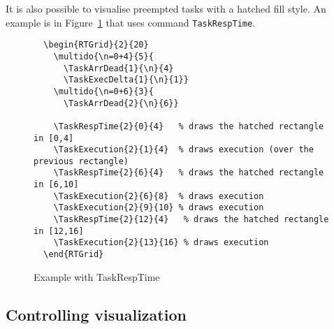 \documentclass{article}
\begin{document}
It is also possible to visualise preempted tasks with a hatched fill
style. An example is in Figure~\ref{fig:resp-time} that uses command
\texttt{TaskRespTime}. 

\begin{figure}
  \centering
  \begin{RTGrid}{2}{20}
 

  \end{RTGrid}  
\begin{verbatim}
  \begin{RTGrid}{2}{20}
    \multido{\n=0+4}{5}{         
      \TaskArrDead{1}{\n}{4}    
      \TaskExecDelta{1}{\n}{1}}
    \multido{\n=0+6}{3}{        
      \TaskArrDead{2}{\n}{6}}

    \TaskRespTime{2}{0}{4}   % draws the hatched rectangle in [0,4]
    \TaskExecution{2}{1}{4}  % draws execution (over the previous rectangle)
    \TaskRespTime{2}{6}{4}   % draws the hatched rectangle in [6,10]
    \TaskExecution{2}{6}{8}  % draws execution
    \TaskExecution{2}{9}{10} % draws execution
    \TaskRespTime{2}{12}{4}   % draws the hatched rectangle in [12,16]
    \TaskExecution{2}{13}{16} % draws execution   
  \end{RTGrid}  
\end{verbatim}
  \caption{Example with TaskRespTime}
  \label{fig:resp-time}
\end{figure}


\subsection{Controlling visualization}
\end{document}
